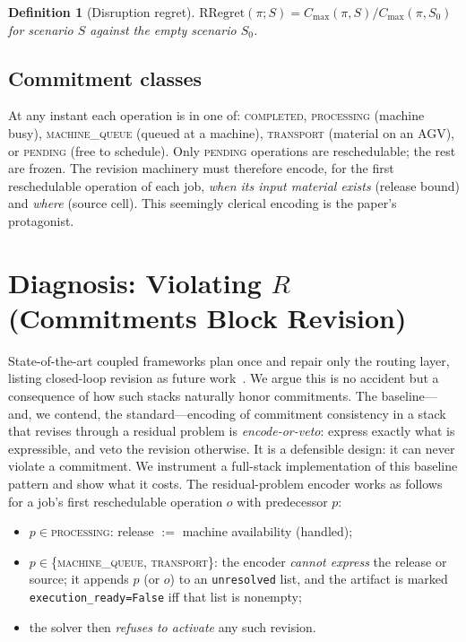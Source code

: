 \documentclass[twocolumn]{article}
\newtheorem{definition}{Definition}
\newcommand{\cmax}{C_{\max}}
\begin{document}
\begin{definition}[Disruption regret]
$\mathrm{RRegret}(\pi;S)=\cmax(\pi,S)/\cmax(\pi,S_0)$ for scenario $S$
against the empty scenario $S_0$.
\end{definition}

\subsection{Commitment classes}
At any instant each operation is in one of:
\textsc{completed}, \textsc{processing} (machine busy),
\textsc{machine\_queue} (queued at a machine), \textsc{transport}
(material on an AGV), or \textsc{pending} (free to schedule).
Only \textsc{pending} operations are reschedulable; the rest are frozen.
The revision machinery must therefore encode, for the first reschedulable
operation of each job, \emph{when its input material exists} (release
bound) and \emph{where} (source cell). This seemingly clerical encoding
is the paper's protagonist.

\section{Diagnosis: Violating $R$ (Commitments Block Revision)}
\label{sec:diagnosis}
State-of-the-art coupled frameworks plan once and repair only the
routing layer, listing closed-loop revision as future
work~\cite{li2026framework}. We argue this is no accident but a
consequence of how such stacks naturally honor commitments. The
baseline---and, we contend, the standard---encoding of commitment
consistency in a stack that revises through a residual problem is
\emph{encode-or-veto}: express exactly what is expressible, and veto
the revision otherwise. It is a defensible design: it can never violate
a commitment. We instrument a full-stack implementation of this
baseline pattern and show what it costs. The residual-problem encoder
works as follows for a job's first reschedulable operation $o$ with
predecessor $p$:
\begin{itemize}
\item $p\in$\textsc{processing}: release $:=$ machine availability
(handled);
\item $p\in$\{\textsc{machine\_queue}, \textsc{transport}\}: the encoder
\emph{cannot express} the release or source; it appends $p$ (or $o$) to
an \texttt{unresolved} list, and the artifact is marked
\texttt{execution\_ready=False} iff that list is nonempty;
\item the solver then \emph{refuses to activate} any such revision.
\end{itemize}
\end{document}
